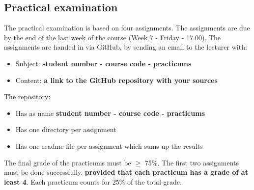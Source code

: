 	\subsection{Practical examination}
		The practical examination is based on four assignments. The assignments are due by the end of the last week of the course (Week 7 - Friday - 17.00). The assignments are handed in via GitHub, by sending an email to the lecturer with:
		
		\begin{itemize}
			\item Subject: \textbf{student number - course code - practicums}
			\item Content: \textbf{a link to the GitHub repository with your sources}			
		\end{itemize}
		
		The repository:
		
		\begin{itemize}
			\item Has as name \textbf{student number - course code - practicums}
			\item Has one directory per assignment
			\item Has one readme file per assignment which sums up the results
		\end{itemize}
		
		The final grade of the practicums must be $\geq$ 75\%. The first two assignments must be done successfully.  \textbf{provided that each practicum has a grade of at least 4}. Each practicum counts for 25\% of the total grade.
